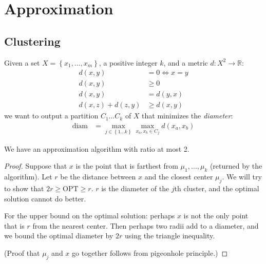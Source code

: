 \chapter{Approximation}
\section{Clustering}
Given a set \(X = \left\{x_1,\ldots, x_m\right\}\), a positive integer \(k\), and a metric \(d: X^2\to \mathbb{R}\):
\begin{align}
d(x,y) &= 0 \iff  x = y \\
d(x, y) &\geq 0 \\
d(x, y) &= d(y, x)\\
d(x, z) + d(z, y) &\geq d(x, y)
\end{align}
we want to output a partition \(C_1\ldots C_k\) of \(X\) that minimizes the \emph{diameter}:
\begin{align}
\text{diam} &= \max_{j \in \left\{1\ldots k\right\}} \max_{x_a, x_b \in C_j} d\left(x_a, x_b\right)
\end{align}

We have an approximation algorithm with ratio at most 2.
\begin{algorithm}
\end{algorithm}
\begin{proof}
	Suppose that \(x\) is the point that is farthest from \(\mu_1, \ldots, \mu_k\) (returned by the algorithm).
	Let \(r\) be the distance between \(x\) and the closest center \(\mu_j\). We will try to show that \(2r \geq \text{OPT} \geq r\).
	\(r\) is the diameter of the \(j\)th cluster, and the optimal solution cannot do better.
	
	For the upper bound on the optimal solution: perhaps \(x\) is not the only point that is \(r\) from the nearest center. Then perhaps two radii add to a diameter, and we bound the optimal diameter by \(2r\) using the triangle inequality.
	
	(Proof that \(\mu_j\) and \(x\) go together follows from pigeonhole principle.)
\end{proof}

